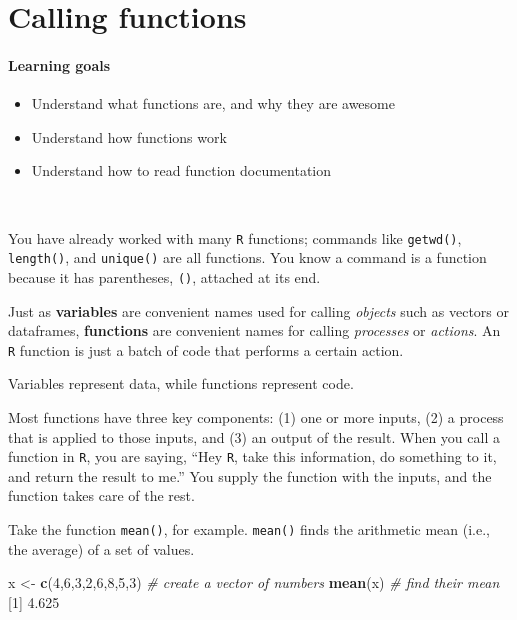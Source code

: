 \documentclass[
]{book}
\newenvironment{Shaded}{\begin{snugshade}}{\end{snugshade}}
\newcommand{\CommentTok}[1]{\textcolor[rgb]{0.56,0.35,0.01}{\textit{#1}}}
\newcommand{\DecValTok}[1]{\textcolor[rgb]{0.00,0.00,0.81}{#1}}
\newcommand{\FloatTok}[1]{\textcolor[rgb]{0.00,0.00,0.81}{#1}}
\newcommand{\KeywordTok}[1]{\textcolor[rgb]{0.13,0.29,0.53}{\textbf{#1}}}
\newcommand{\NormalTok}[1]{#1}
\newcommand{\StringTok}[1]{\textcolor[rgb]{0.31,0.60,0.02}{#1}}
\providecommand{\tightlist}{%
  \setlength{\itemsep}{0pt}\setlength{\parskip}{0pt}}
\begin{document}
\hypertarget{calling_functions}{%
\chapter{Calling functions}\label{calling_functions}}

\hypertarget{learning-goals-4}{%
\subsubsection*{Learning goals}\label{learning-goals-4}}

\begin{itemize}
\tightlist
\item
  Understand what functions are, and why they are awesome
\item
  Understand how functions work
\item
  Understand how to read function documentation
\end{itemize}

~

You have already worked with many \texttt{R} functions; commands like \texttt{getwd()}, \texttt{length()}, and \texttt{unique()} are all functions. You know a command is a function because it has parentheses, \texttt{()}, attached at its end.

Just as \textbf{variables} are convenient names used for calling \emph{objects} such as vectors or dataframes, \textbf{functions} are convenient names for calling \emph{processes} or \emph{actions}. An \texttt{R} function is just a batch of code that performs a certain action.

Variables represent data, while functions represent code.

Most functions have three key components: (1) one or more inputs, (2) a process that is applied to those inputs, and (3) an output of the result. When you call a function in \texttt{R}, you are saying, ``Hey \texttt{R}, take this information, do something to it, and return the result to me.'' You supply the function with the inputs, and the function takes care of the rest.

Take the function \texttt{mean()}, for example. \texttt{mean()} finds the arithmetic mean (i.e., the average) of a set of values.

\begin{Shaded}
\begin{Highlighting}[]
\NormalTok{x <-}\StringTok{ }\KeywordTok{c}\NormalTok{(}\DecValTok{4}\NormalTok{,}\DecValTok{6}\NormalTok{,}\DecValTok{3}\NormalTok{,}\DecValTok{2}\NormalTok{,}\DecValTok{6}\NormalTok{,}\DecValTok{8}\NormalTok{,}\DecValTok{5}\NormalTok{,}\DecValTok{3}\NormalTok{) }\CommentTok{# create a vector of numbers}
\KeywordTok{mean}\NormalTok{(x) }\CommentTok{# find their mean}
\NormalTok{[}\DecValTok{1}\NormalTok{] }\FloatTok{4.625}
\end{Highlighting}
\end{Shaded}
\end{document}
